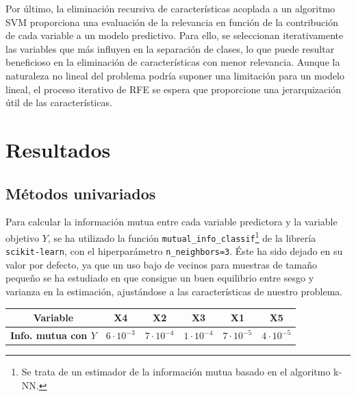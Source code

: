 \documentclass[a4paper,12pt]{article}
\begin{document}

Por último, la eliminación recursiva de características acoplada a un algoritmo SVM proporciona una evaluación de la relevancia en función de la contribución de cada variable a un modelo predictivo. Para ello, se seleccionan iterativamente las variables que más influyen en la separación de clases, lo que puede resultar beneficioso en la eliminación de características con menor relevancia. Aunque la naturaleza no lineal del problema podría suponer una limitación para un modelo lineal, el proceso iterativo de RFE se espera que proporcione una jerarquización útil de las características.

\newpage
\section{Resultados}

\subsection{Métodos univariados}

Para calcular la información mutua entre cada variable predictora y la variable objetivo \( Y \), se ha utilizado la función \texttt{mutual\_info\_classif}\footnote{Se trata de un estimador de la información mutua basado en el algoritmo k-NN.} de la librería \texttt{scikit-learn}, con el hiperparámetro \texttt{n\_neighbors=3}. Éste ha sido dejado en su valor por defecto, ya que un uso bajo de vecinos para muestras de tamaño pequeño se ha estudiado en \cite{kraskov2004} que consigue un buen equilibrio entre sesgo y varianza en la estimación, ajustándose a las características de nuestro problema.


\begin{table}[h]
    \centering
    \begin{tabular}{|c|c|c|c|c|c|}
        \hline
        \textbf{Variable}            & \textbf{X4}         & \textbf{X2}         & \textbf{X3}         & \textbf{X1}         & \textbf{X5}         \\
        \hline
        \textbf{Info. mutua con $Y$} & \(6 \cdot 10^{-3}\) & \(7 \cdot 10^{-4}\) & \(1 \cdot 10^{-4}\) & \(7 \cdot 10^{-5}\) & \(4 \cdot 10^{-5}\) \\
        \hline
    \end{tabular}
    \label{tab:mutual_information}
\end{table}
\end{document}
